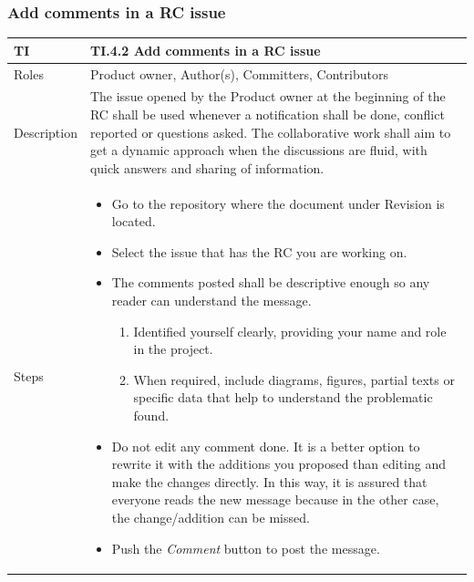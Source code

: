 \documentclass{template/openetcs_article}
\begin{document}
\subsubsection{Add comments in a RC issue}

\begin{flushleft}
\tablefirsthead{}
\tablehead{}
\tabletail{}
\tablelasttail{}
\begin{supertabular}{|m{2cm}|m{13cm}|}
\hline
{}
TI & 
TI.4.2 Add comments in a RC issue
\\\hline
Roles &
Product owner, Author(s), Committers, Contributors
\\\hline
Description &
The issue opened by the Product owner at the beginning of the RC shall be used whenever a notification shall be done, conflict reported or questions asked. The collaborative work shall aim to get a dynamic approach when the discussions are fluid, with quick answers and sharing of information.
\\\hline
Steps &
\begin{itemize}
\item Go to the repository where the document under Revision is located.
\item Select the issue that has the RC you are working on.
\item The comments posted shall be descriptive enough so any reader can understand the message. 
\begin{enumerate}
\item Identified yourself clearly, providing your name and role in the project.
\item When required, include diagrams, figures, partial texts or specific data that help to understand the problematic found.
\end{enumerate}
\item Do not edit any comment done. It is a better option to rewrite it with the additions you proposed than editing and make the changes directly. In this way, it is assured that everyone reads the new message because in the other case, the change/addition can be missed.
\item Push the {\it Comment} button to post the message.
\end{itemize}

\\\hline
\end{supertabular}
\end{flushleft}
\end{document}
